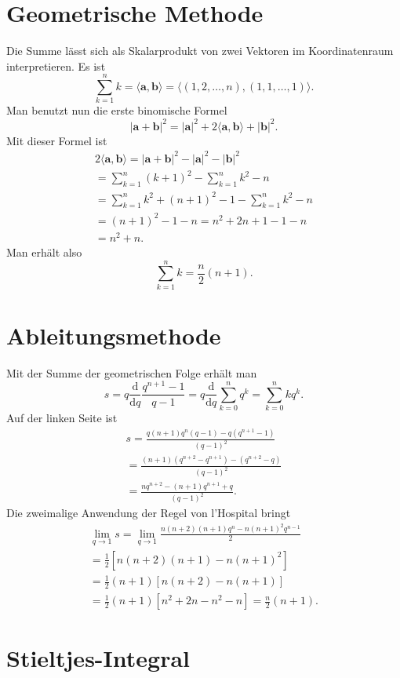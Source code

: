 \documentclass[a4paper,10pt,fleqn,twocolumn,twoside]{scrartcl}
\newcommand{\bvec}[1]{\mathbf{#1}}
\begin{document}
\section{Geometrische Methode}

Die Summe lässt sich als Skalarprodukt von zwei Vektoren im
Koordinatenraum interpretieren. Es ist%
\[\sum_{k=1}^n k = \langle \bvec a,\bvec b\rangle
= \langle (1,2,\ldots,n),(1,1,\ldots,1)\rangle.\]
Man benutzt nun die erste binomische Formel%
\[|\bvec a+\bvec b|^2
= |\bvec a|^2+2\langle\bvec a,\bvec b\rangle +|\bvec b|^2.\]
Mit dieser Formel ist
\begin{gather*}
2\langle\bvec a,\bvec b\rangle
= |\bvec a+\bvec b|^2-|\bvec a|^2-|\bvec b|^2\\
= \sum_{k=1}^n (k+1)^2-\sum_{k=1}^n k^2-n\\
= \sum_{k=1}^n k^2+(n+1)^2-1-\sum_{k=1}^n k^2-n\\
= (n+1)^2-1-n = n^2+2n+1-1-n\\
= n^2+n.
\end{gather*}
Man erhält also
\[\sum_{k=1}^n k = \frac{n}{2}(n+1).\]

\section{Ableitungsmethode}

Mit der Summe der geometrischen Folge erhält man%
\[s=q\frac{\mathrm d}{\mathrm dq} \frac{q^{n+1}-1}{q-1}
= q\frac{\mathrm d}{\mathrm dq}
\sum_{k=0}^n q^k = \sum_{k=0}^n kq^k.\]
Auf der linken Seite ist
\begin{gather*}
s=\frac{q(n+1)q^n(q-1)-q(q^{n+1}-1)}{(q-1)^2}\\
= \frac{(n+1)(q^{n+2}-q^{n+1})-(q^{n+2}-q)}{(q-1)^2}\\
= \frac{nq^{n+2}-(n+1)q^{n+1}+q}{(q-1)^2}.
\end{gather*}
Die zweimalige Anwendung der Regel von l'Hospital bringt%
\begin{gather*}
\lim_{q\rightarrow 1}s = \lim_{q\rightarrow 1}
\frac{n(n+2)(n+1)q^n-n(n+1)^2q^{n-1}}{2}\\
= \frac{1}{2}[n(n+2)(n+1)-n(n+1)^2]\\
= \frac{1}{2}(n+1)[n(n+2)-n(n+1)]\\
= \frac{1}{2}(n+1)[n^2+2n-n^2-n]
= \frac{n}{2}(n+1).
\end{gather*}

\section{Stieltjes-Integral}
\end{document}
